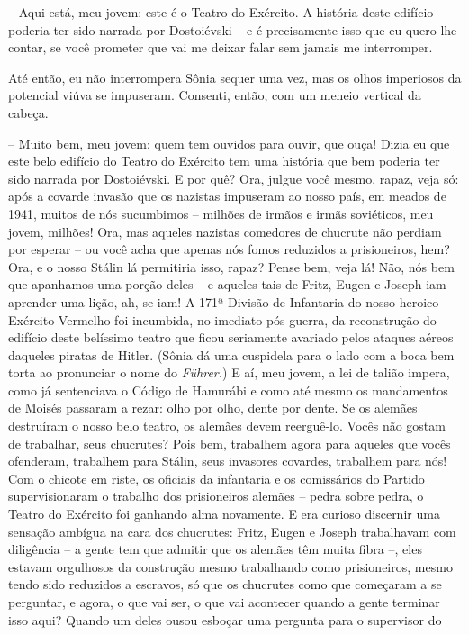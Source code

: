 -- Aqui está, meu jovem: este é o Teatro do Exército. A história deste
edifício poderia ter sido narrada por Dostoiévski -- e é precisamente
isso que eu quero lhe contar, se você prometer que vai me deixar falar
sem jamais me interromper.

Até então, eu não interrompera Sônia sequer uma vez, mas os olhos
imperiosos da potencial viúva se impuseram. Consenti, então, com um
meneio vertical da cabeça.

-- Muito bem, meu jovem: quem tem ouvidos para ouvir, que ouça! Dizia eu
que este belo edifício do Teatro do Exército tem uma história que bem
poderia ter sido narrada por Dostoiévski. E por quê? Ora, julgue você
mesmo, rapaz, veja só: após a covarde invasão que os nazistas impuseram
ao nosso país, em meados de 1941, muitos de nós sucumbimos -- milhões de
irmãos e irmãs soviéticos, meu jovem, milhões! Ora, mas aqueles nazistas
comedores de chucrute não perdiam por esperar -- ou você acha que apenas
nós fomos reduzidos a prisioneiros, hem? Ora, e o nosso Stálin lá
permitiria isso, rapaz? Pense bem, veja lá! Não, nós bem que apanhamos
uma porção deles -- e aqueles tais de Fritz, Eugen e Joseph iam aprender
uma lição, ah, se iam! A 171ª Divisão de Infantaria do nosso heroico
Exército Vermelho foi incumbida, no imediato pós-guerra, da reconstrução
do edifício deste belíssimo teatro que ficou seriamente avariado pelos
ataques aéreos daqueles piratas de Hitler. (Sônia dá uma cuspidela para
o lado com a boca bem torta ao pronunciar o nome do \emph{Führer.}) E
aí, meu jovem, a lei de talião impera, como já sentenciava o Código de
Hamurábi e como até mesmo os mandamentos de Moisés passaram a rezar:
olho por olho, dente por dente. Se os alemães destruíram o nosso belo
teatro, os alemães devem reerguê-lo. Vocês não gostam de trabalhar, seus
chucrutes? Pois bem, trabalhem agora para aqueles que vocês ofenderam,
trabalhem para Stálin, seus invasores covardes, trabalhem para nós! Com
o chicote em riste, os oficiais da infantaria e os comissários do
Partido supervisionaram o trabalho dos prisioneiros alemães -- pedra
sobre pedra, o Teatro do Exército foi ganhando alma novamente. E era
curioso discernir uma sensação ambígua na cara dos chucrutes: Fritz,
Eugen e Joseph trabalhavam com diligência -- a gente tem que admitir que
os alemães têm muita fibra --, eles estavam orgulhosos da construção
mesmo trabalhando como prisioneiros, mesmo tendo sido reduzidos a
escravos, só que os chucrutes como que começaram a se perguntar, e
agora, o que vai ser, o que vai acontecer quando a gente terminar isso
aqui? Quando um deles ousou esboçar uma pergunta para o supervisor do
